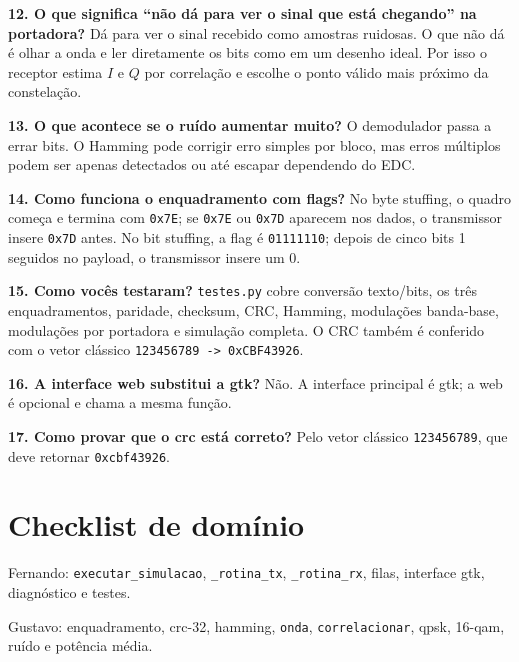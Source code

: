 \documentclass[10pt,a4paper]{article}
\begin{document}
\textbf{12. O que significa ``não dá para ver o sinal que está chegando'' na
portadora?} Dá para ver o sinal recebido como amostras ruidosas. O que não dá é
olhar a onda e ler diretamente os bits como em um desenho ideal. Por isso o
receptor estima \(I\) e \(Q\) por correlação e escolhe o ponto válido mais
próximo da constelação.

\textbf{13. O que acontece se o ruído aumentar muito?} O demodulador passa a
errar bits. O Hamming pode corrigir erro simples por bloco, mas erros múltiplos
podem ser apenas detectados ou até escapar dependendo do EDC.

\textbf{14. Como funciona o enquadramento com flags?} No byte stuffing, o
quadro começa e termina com \texttt{0x7E}; se \texttt{0x7E} ou \texttt{0x7D}
aparecem nos dados, o transmissor insere \texttt{0x7D} antes. No bit stuffing,
a flag é \texttt{01111110}; depois de cinco bits 1 seguidos no payload, o
transmissor insere um 0.

\textbf{15. Como vocês testaram?} \texttt{testes.py} cobre conversão
texto/bits, os três enquadramentos, paridade, checksum, CRC, Hamming,
modulações banda-base, modulações por portadora e simulação completa. O CRC
também é conferido com o vetor clássico \texttt{123456789 -> 0xCBF43926}.

\textbf{16. A interface web substitui a gtk?} Não. A interface principal é gtk; a
web é opcional e chama a mesma função.

\textbf{17. Como provar que o crc está correto?} Pelo vetor clássico
\texttt{123456789}, que deve retornar \texttt{0xcbf43926}.

\section{Checklist de domínio}

Fernando: \texttt{executar\_simulacao}, \texttt{\_rotina\_tx},
\texttt{\_rotina\_rx}, filas, interface gtk, diagnóstico e testes.

Gustavo: enquadramento, crc-32, hamming, \texttt{onda},
\texttt{correlacionar}, qpsk, 16-qam, ruído e potência média.
\end{document}
